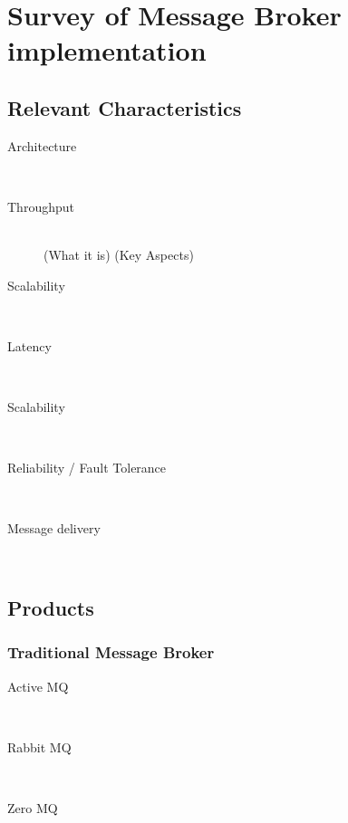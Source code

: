 \chapter{Survey of Message Broker implementation} 
\label{survey-broker}

\section{Relevant Characteristics}
\begin{description}
    \item [Architecture] \hfill \\
    {}
    \item [Throughput] \hfill \\
        { (What it is) (Key Aspects)}
    \item [Scalability] \hfill \\
    {}
    \item [Latency]\hfill \\
    {}
    \item [Scalability] \hfill \\
    {}
    \item [Reliability / Fault Tolerance] \hfill \\
    {}
    \item [Message delivery] \hfill \\
    {}

\end{description}
\section{Products}
\subsection{Traditional Message Broker}

\begin{description}
    \item [Active MQ] \hfill \\
        {}
    \item [Rabbit MQ] \hfill \\
    {}
    \item [Zero MQ] \hfill \\
    {}
\end{description}


